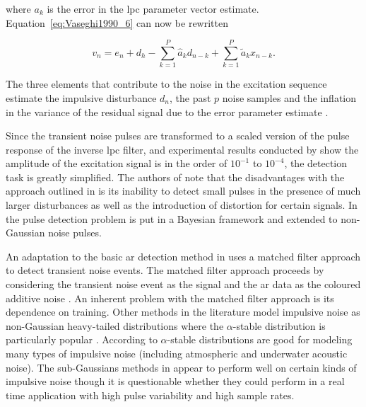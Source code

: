 where $a_k$ is the error in the \DIFdelbegin {}\DIFdelend \DIFaddbegin \gls{lpc} \DIFaddend parameter vector estimate. Equation~\ref{eq:Vaseghi1990_6} can now be rewritten

\begin{equation}\label{eq:Vaseghi1990_7}
v_n = e_n + d_h - \sum^P_{k=1} \hat{a}_k d_{n-k} + \sum^P_{k=1} \tilde{a}_k x_{n-k}.
\end{equation}

The three elements that contribute to the noise in the excitation sequence estimate \DIFdelbegin {}\DIFdelend \DIFaddbegin {}\DIFaddend the impulsive disturbance $d_n$, the past $p$ noise samples and the inflation in the variance of the residual signal due to the error parameter estimate \cite{Vaseghi1990}.

Since the transient noise pulses are transformed to a scaled version of the pulse response of the inverse \DIFdelbegin {}\DIFdelend \DIFaddbegin \gls{lpc} \DIFaddend filter, and experimental results conducted by \cite{Vaseghi1990} show the amplitude of the excitation signal is in the order of $10^{-1}$ to $10^{-4}$, the detection task is greatly simplified. The authors of \cite{Godsill1998} note that the disadvantages with the approach outlined in \cite{Vaseghi1990} is its inability to detect small pulses in the presence of much larger disturbances as well as the introduction of distortion for certain signals. In \cite{Godsill1998} the pulse detection problem is put in a Bayesian framework and extended to non-Gaussian noise pulses.

An adaptation to the basic \DIFdelbegin {}\DIFdelend \DIFaddbegin \gls{ar} \DIFaddend detection method in \cite{Vaseghi1988} uses a matched filter approach to detect transient noise events. The matched filter approach proceeds by considering the transient noise event as the signal and the \DIFdelbegin {}\DIFdelend \DIFaddbegin \gls{ar} \DIFaddend data as the coloured additive noise \cite{Godsill1998book}. An inherent problem with the matched filter approach is its dependence on training. Other methods in the literature model impulsive noise as non-Gaussian heavy-tailed distributions where the $\alpha$-stable distribution is particularly popular \cite{Tsihrintzis1997}\cite{Coates2002}. According to \cite{Nikias1995} $\alpha$-stable distributions are good for modeling many types of impulsive noise (including atmospheric and underwater acoustic noise). The sub-Gaussians methods in \cite{Tsihrintzis1997}\cite{Coates2002} appear to perform well on certain kinds of impulsive noise though it is questionable whether they could perform in a real time application with high pulse variability and high sample rates.

